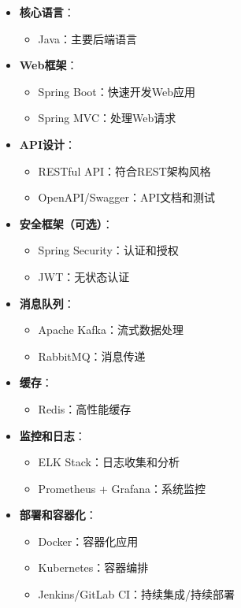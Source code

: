 \documentclass[a4paper,12pt]{article}
\begin{document}
\begin{itemize}
  \item \textbf{核心语言}：
    \begin{itemize}
      \item Java：主要后端语言
    \end{itemize}
  
  \item \textbf{Web框架}：
    \begin{itemize}
      \item Spring Boot：快速开发Web应用
      \item Spring MVC：处理Web请求
    \end{itemize}
  
  \item \textbf{API设计}：
    \begin{itemize}
      \item RESTful API：符合REST架构风格
      \item OpenAPI/Swagger：API文档和测试
    \end{itemize}
  
  \item \textbf{安全框架（可选）}：
    \begin{itemize}
      \item Spring Security：认证和授权
      \item JWT：无状态认证
    \end{itemize}
  
  \item \textbf{消息队列}：
    \begin{itemize}
      \item Apache Kafka：流式数据处理
      \item RabbitMQ：消息传递
    \end{itemize}
  
  \item \textbf{缓存}：
    \begin{itemize}
      \item Redis：高性能缓存
    \end{itemize}
  
  \item \textbf{监控和日志}：
    \begin{itemize}
      \item ELK Stack：日志收集和分析
      \item Prometheus + Grafana：系统监控
    \end{itemize}
  
  \item \textbf{部署和容器化}：
    \begin{itemize}
      \item Docker：容器化应用
      \item Kubernetes：容器编排
      \item Jenkins/GitLab CI：持续集成/持续部署
    \end{itemize}
\end{itemize}
\end{document}
